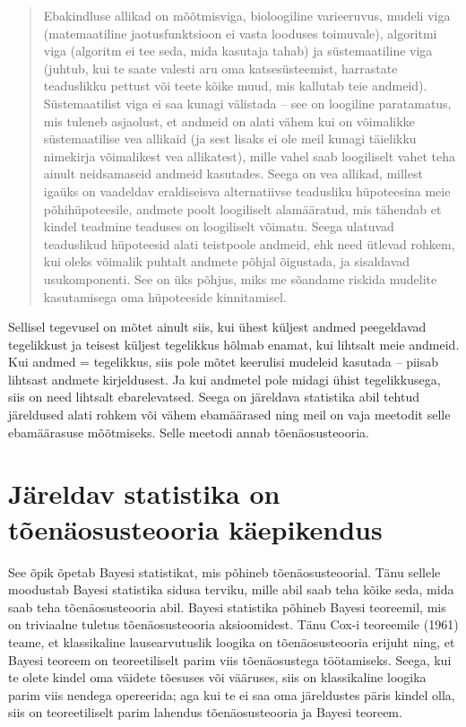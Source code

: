 \documentclass[]{book}
\begin{document}
\begin{quote}
Ebakindluse allikad on mõõtmisviga, bioloogiline varieeruvus, mudeli
viga (matemaatiline jaotusfunktsioon ei vasta looduses toimuvale),
algoritmi viga (algoritm ei tee seda, mida kasutaja tahab) ja
süstemaatiline viga (juhtub, kui te saate valesti aru oma
katsesüsteemist, harrastate teaduslikku pettust või teete kõike muud,
mis kallutab teie andmeid). Süstemaatilist viga ei saa kunagi välistada
-- see on loogiline paratamatus, mis tuleneb asjaolust, et andmeid on
alati vähem kui on võimalikke süstemaatilise vea allikaid (ja sest
lisaks ei ole meil kunagi täielikku nimekirja võimalikest vea
allikatest), mille vahel saab loogiliselt vahet teha ainult neidsamaseid
andmeid kasutades. Seega on vea allikad, millest igaüks on vaadeldav
eraldiseisva alternatiivse teadusliku hüpoteesina meie põhihüpoteesile,
andmete poolt loogiliselt alamääratud, mis tähendab et kindel teadmine
teaduses on loogiliselt võimatu. Seega ulatuvad teaduslikud hüpoteesid
alati teistpoole andmeid, ehk need ütlevad rohkem, kui oleks võimalik
puhtalt andmete põhjal õigustada, ja sisaldavad usukomponenti. See on
üks põhjus, miks me sõandame riskida mudelite kasutamisega oma
hüpoteeside kinnitamisel.
\end{quote}

Sellisel tegevusel on mõtet ainult siis, kui ühest küljest andmed
peegeldavad tegelikkust ja teisest küljest tegelikkus hõlmab enamat, kui
lihtsalt meie andmeid. Kui andmed = tegelikkus, siis pole mõtet
keerulisi mudeleid kasutada -- piisab lihtsast andmete kirjeldusest. Ja
kui andmetel pole midagi ühist tegelikkusega, siis on need lihtsalt
ebarelevatsed. Seega on järeldava statistika abil tehtud järeldused
alati rohkem või vähem ebamäärased ning meil on vaja meetodit selle
ebamäärasuse mõõtmiseks. Selle meetodi annab tõenäosusteooria.

\section*{Järeldav statistika on tõenäosusteooria
käepikendus}\label{jareldav-statistika-on-toenaosusteooria-kaepikendus}

See õpik õpetab Bayesi statistikat, mis põhineb tõenäosusteoorial. Tänu
sellele moodustab Bayesi statistika sidusa terviku, mille abil saab teha
kõike seda, mida saab teha tõenäosusteooria abil. Bayesi statistika
põhineb Bayesi teoreemil, mis on triviaalne tuletus tõenäosusteooria
aksioomidest. Tänu Cox-i teoreemile (1961) teame, et klassikaline
lausearvutuslik loogika on tõenäosusteooria erijuht ning, et Bayesi
teoreem on teoreetiliselt parim viis tõenäosustega töötamiseks. Seega,
kui te olete kindel oma väidete tõesuses või vääruses, siis on
klassikaline loogika parim viis nendega opereerida; aga kui te ei saa
oma järeldustes päris kindel olla, siis on teoreetiliselt parim lahendus
tõenäosusteooria ja Bayesi teoreem.
\end{document}
